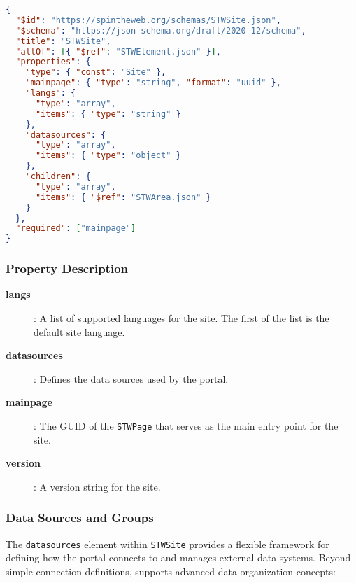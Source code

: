 \begin{lstlisting}[language=JSON,caption={STWSite Schema Definition}]
{
  "$id": "https://spintheweb.org/schemas/STWSite.json",
  "$schema": "https://json-schema.org/draft/2020-12/schema",
  "title": "STWSite",
  "allOf": [{ "$ref": "STWElement.json" }],
  "properties": {
    "type": { "const": "Site" },
    "mainpage": { "type": "string", "format": "uuid" },
    "langs": {
      "type": "array",
      "items": { "type": "string" }
    },
    "datasources": {
      "type": "array",
      "items": { "type": "object" }
    },
    "children": {
      "type": "array",
      "items": { "$ref": "STWArea.json" }
    }
  },
  "required": ["mainpage"]
}
\end{lstlisting}

\subsubsection{Property Description}

\begin{description}
\item[\textbf{langs}]: A list of supported languages for the site. The first of the list is the default site language.
\item[\textbf{datasources}]: Defines the data sources used by the portal.
\item[\textbf{mainpage}]: The GUID of the \texttt{STWPage} that serves as the main entry point for the site.
\item[\textbf{version}]: A version string for the site.
\end{description}

\subsubsection{Data Sources and Groups}
\label{sec:datasources-groups}

The \texttt{datasources} element within \texttt{STWSite} provides a flexible framework for defining how the portal connects to and manages external data systems. Beyond simple connection definitions, \wbdl{} supports advanced data organization concepts:

